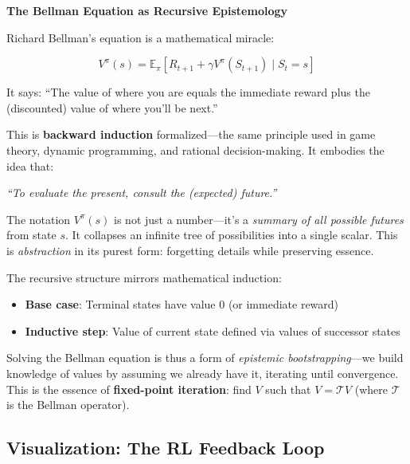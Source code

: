 \begin{philobox}
\textbf{The Bellman Equation as Recursive Epistemology}

Richard Bellman's equation is a mathematical miracle:

\begin{equation}
    V^\pi(s) = \mathbb{E}_\pi\left[ R_{t+1} + \gamma V^\pi(S_{t+1}) \mid S_t = s \right]
\end{equation}

It says: ``The value of where you are equals the immediate reward plus the (discounted) value of where you'll be next.''

This is \textbf{backward induction} formalized---the same principle used in game theory, dynamic programming, and rational decision-making. It embodies the idea that:

\begin{center}
\itshape
``To evaluate the present, consult the (expected) future.''
\end{center}

The notation $V^\pi(s)$ is not just a number---it's a \textit{summary of all possible futures} from state $s$. It collapses an infinite tree of possibilities into a single scalar. This is \textit{abstraction} in its purest form: forgetting details while preserving essence.

The recursive structure mirrors mathematical induction:
\begin{itemize}
    \item \textbf{Base case}: Terminal states have value 0 (or immediate reward)
    \item \textbf{Inductive step}: Value of current state defined via values of successor states
\end{itemize}

Solving the Bellman equation is thus a form of \textit{epistemic bootstrapping}---we build knowledge of values by assuming we already have it, iterating until convergence. This is the essence of \textbf{fixed-point iteration}: find $V$ such that $V = \mathcal{T}V$ (where $\mathcal{T}$ is the Bellman operator).
\end{philobox}

\subsection{Visualization: The RL Feedback Loop}

